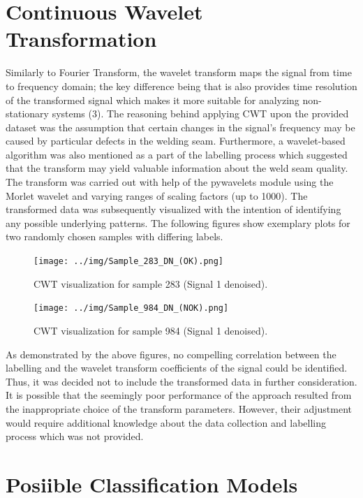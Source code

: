 \documentclass[12pt]{report}
\begin{document}
\section{Continuous Wavelet Transformation}
Similarly to Fourier Transform, the wavelet transform maps the signal from time to frequency domain; the key difference being that is also provides time resolution of the transformed signal which makes it more suitable for analyzing non-stationary systems (3). The reasoning behind applying CWT upon the provided dataset was the assumption that certain changes in the signal’s frequency may be caused by particular defects in the welding seam. Furthermore, a wavelet-based algorithm was also mentioned as a part of the labelling process which suggested that the transform may yield valuable information about the weld seam quality.
The transform was carried out with help of the pywavelets module using the Morlet wavelet and varying ranges of scaling factors (up to 1000). The transformed data was subsequently visualized with the intention of identifying any possible underlying patterns. The following figures show exemplary plots for two randomly chosen samples with differing labels.
\begin{figure}[H]
	\centering
	\texttt{[image: ../img/Sample\_283\_DN\_(OK).png]}
	\caption{CWT visualization for sample 283 (Signal 1 denoised).}
	\label{fig:CWT1}
\end{figure}
\begin{figure}[H]
	\centering
	\texttt{[image: ../img/Sample\_984\_DN\_(NOK).png]}
	\caption{CWT visualization for sample 984 (Signal 1 denoised).}
	\label{fig:CW2}
\end{figure}
As demonstrated by the above figures, no compelling correlation between the labelling and the wavelet transform coefficients of the signal could be identified. Thus, it was decided not to include the transformed data in further consideration. It is possible that the seemingly poor performance of the approach resulted from the inappropriate choice of the transform parameters. However, their adjustment would require additional knowledge about the data collection and labelling process which was not provided.


\section{Posiible Classification Models} 
\end{document}

